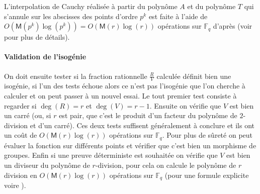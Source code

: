 \documentclass[10pt,a4paper]{book}
\theoremstyle{plain}
\theoremstyle{definition}
\theoremstyle{definition}
\newtheorem{lem}[thm]{Lemme}
\theoremstyle{definition}
\theoremstyle{definition}
\theoremstyle{definition}
\theoremstyle{remark}
\theoremstyle{remark}
\theoremstyle{definition}
\begin{document}
L'interpolation de Cauchy réalisée à partir du polynôme $A$ et du polynôme $T$ 
qui s'annule sur les abscisses des points d'ordre $p^k$ est faite à l'aide de 
\newline $O(\mathsf{M}(p^{k})\log(p^k))=O(\mathsf{M}(r)\log(r))$ opérations sur $\mathbb{F}_q$ d'après \cite[§ 11.1]{vzGJG03} (voir \cite[Théorème 7.5]{algeff17} pour plus de détails).


%

\paragraph{Validation de l'isogénie} \label{par:val:iso}
 On doit ensuite tester si la fraction rationnelle $\frac{R}{V}$ calculée 
définit bien une isogénie, si l'un des tests échoue alors ce n'est pas l'isogénie que l'on cherche à calculer et on peut passer à un nouvel essai. Le tout premier test consiste à regarder si $\deg(R)=r$ et $\deg(V)=r-1$. Ensuite on vérifie que $V$ est bien un carré (ou, si $r$ est pair, que c'est le produit d'un facteur du polynôme de $2$-division et d'un carré). Ces deux tests suffisent généralement à conclure et ils ont un coût de $O(\mathsf{M}(r) \log(r))$ opérations sur $\mathbb{F}_q$. Pour plus de sûreté on peut évaluer la fonction sur différents points et vérifier que c'est bien un morphisme de groupes. Enfin si une preuve déterministe est souhaitée on vérifie que $V$ est bien un diviseur du polynôme de $r$-division, pour cela on calcule le polynôme de $r$ division en $O(\mathsf{M}(r)\log(r))$ opérations sur $\mathbb{F}_q$ (pour une formule explicite voire \cite[§4.4.5.a]{ehcc05}). 
\end{document}
